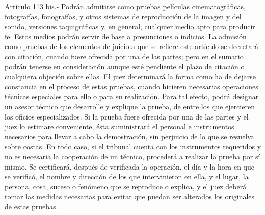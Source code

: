     Artículo 113 bis.- Podrán admitirse como pruebas películas cinematográficas, fotografías, fonografías, y otros sistemas de reproducción de la imagen y del sonido, versiones taquigráficas y, en general, cualquier medio apto para producir fe. Estos medios podrán servir de base a presunciones o indicios.
    La admisión como pruebas de los elementos de juicio a que se refiere este artículo se decretará con citación, cuando fuere ofrecida por una de las partes; pero en el sumario podrán tenerse en consideración aunque esté pendiente el plazo de citación o cualquiera objeción sobre ellas.
    El juez determinará la forma como ha de dejarse constancia en el proceso de estas pruebas, cuando hicieren necesarias operaciones técnicas especiales para ello o para su realización.  Para tal efecto, podrá designar un asesor técnico que desarrolle y explique la prueba, de entre los que ejercieren los oficios especializados.  Si la prueba fuere ofrecida por una de las partes y el juez lo estimare conveniente, ésta suministrará el personal e instrumentos necesarios para llevar a cabo la demostración, sin perjuicio de lo que se resuelva sobre costas.  En todo caso, si el tribunal cuenta con los instrumentos requeridos y no es necesaria la cooperación de un técnico, procederá a realizar la prueba por sí mismo.
    Se certificará, después de verificada la operación, el día y la hora en que se verificó, el nombre y dirección de los que intervinieron en ella, y el lugar, la persona, cosa, suceso o fenómeno que se reproduce o explica, y el juez deberá tomar las medidas necesarias para evitar que puedan ser alterados los originales de estas pruebas.

